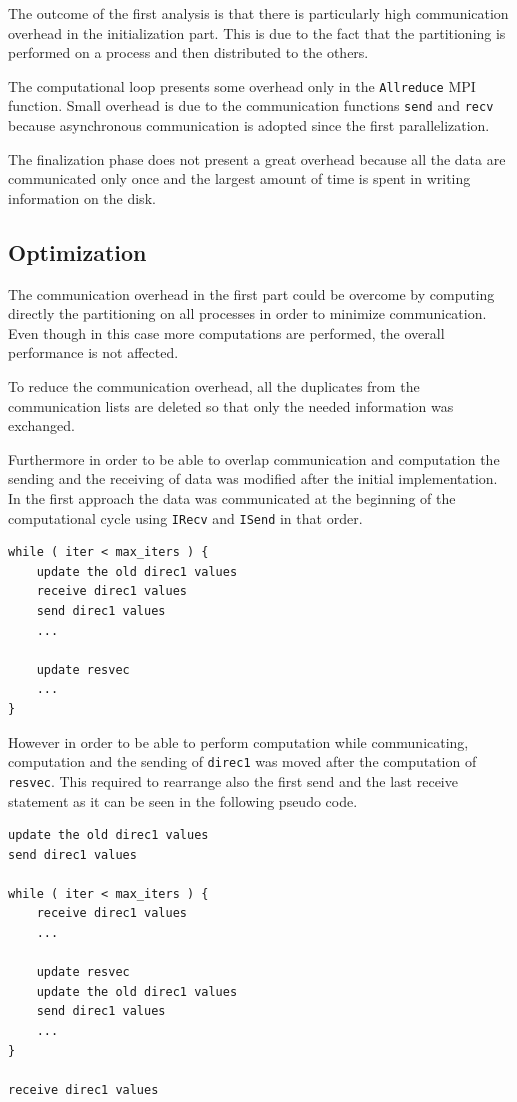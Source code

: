 \documentclass[12pt, a4paper]{article}
\begin{document}
The outcome of the first analysis is that there is particularly high
communication overhead in the initialization part. This is due to the fact that
the partitioning is performed on a process and then distributed to the others.

The computational loop presents some overhead only in the \verb=Allreduce= MPI
function. Small overhead is due to the communication functions \verb=send= and
\verb=recv= because asynchronous communication is adopted since the first
parallelization.

The finalization phase does not present a great overhead because all the data
are communicated only once and the largest amount of time is spent in writing
information on the disk.

\subsection*{Optimization}
The communication overhead in the first part could be overcome by computing 
directly the partitioning on all processes in order to minimize communication. 
Even though in this case more computations are performed, the overall
performance is not affected.

To reduce the communication overhead, all the duplicates from the communication
lists are deleted so that only the needed information was exchanged.

Furthermore in order to be able to overlap communication and computation the
sending and the receiving of data was modified after the initial implementation.
In the first approach the data was communicated at the beginning of the
computational cycle using \verb=IRecv= and \verb=ISend= in that order.

\begin{verbatim}
while ( iter < max_iters ) {
    update the old direc1 values
    receive direc1 values
    send direc1 values
    ...

    update resvec
    ...
}
\end{verbatim}

However in order to be able to perform computation while communicating, 
computation and the sending of \verb=direc1= was moved after the computation of
\verb=resvec=.
This required to rearrange also the first send and the last receive statement as
it can be seen in the following pseudo code.

\begin{verbatim}
update the old direc1 values
send direc1 values

while ( iter < max_iters ) {
    receive direc1 values
    ...

    update resvec
    update the old direc1 values
    send direc1 values
    ...
}

receive direc1 values
\end{verbatim}
\end{document}
